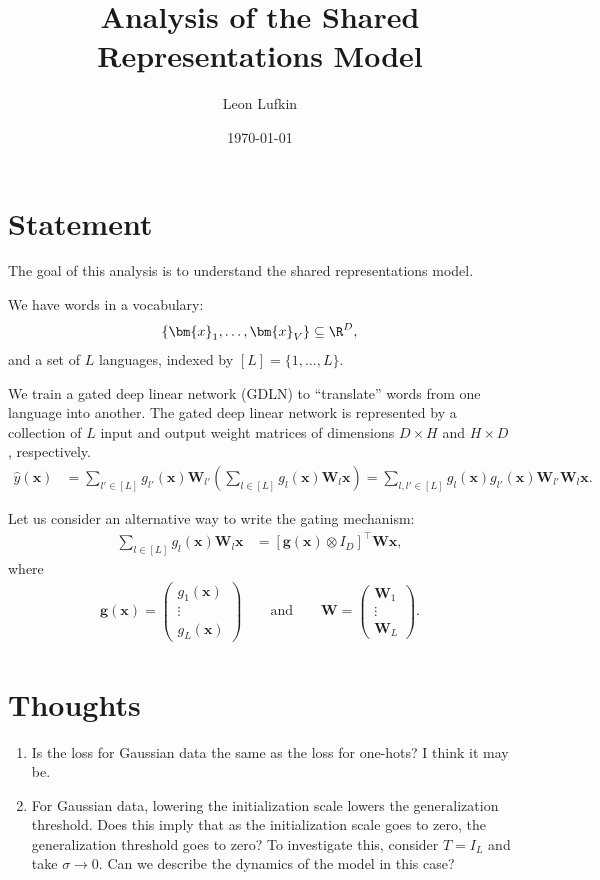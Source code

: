 \documentclass{article}
\title{Analysis of the Shared Representations Model}
\author{Leon Lufkin}
\date{\today}
\begin{document}
\section{Statement}
The goal of this analysis is to understand the shared representations model.

We have words in a vocabulary:
\begin{align*}
    \{ \bm{x}_1, \ldots, \bm{x}_V \} \subseteq \R^D,
\end{align*}
and a set of $L$ languages, indexed by $[L] = \{ 1, \ldots, L \}$.

We train a gated deep linear network (GDLN) to ``translate'' words from one language into another.
The gated deep linear network is represented by a collection of $L$ input and output weight matrices of dimensions $D \times H$ and $H \times D$, respectively.
\begin{align*}
    \hat{y}(\bm{x})
    &= \sum_{l' \in [L]} g_{l'}(\bm{x}) \bm{W}_{l'} \left( \sum_{l \in [L]} g_l(\bm{x}) \bm{W}_l \bm{x} \right) 
    = \sum_{l,l' \in [L]} g_l(\bm{x}) g_{l'}(\bm{x}) \bm{W}_{l'} \bm{W}_l \bm{x}.
\end{align*}

Let us consider an alternative way to write the gating mechanism:
\begin{align*}
    \sum_{l\in[L]} g_l(\bm{x}) \bm{W}_l \bm{x}
    &= [\bm{g}(\bm{x}) \otimes I_D]^\top \bm{W} \bm{x},
\end{align*}
where 
\begin{align*}
    \bm{g}(\bm{x}) = \begin{pmatrix} g_1(\bm{x}) \\ \vdots \\ g_L(\bm{x}) \end{pmatrix}
    \qquad \text{and} \qquad
    \bm{W} = \begin{pmatrix} \bm{W}_1 \\ \vdots \\ \bm{W}_L \end{pmatrix}.
\end{align*}

\section{Thoughts}
\begin{enumerate}
    \item Is the loss for Gaussian data the same as the loss for one-hots? I think it may be.
    \item For Gaussian data, lowering the initialization scale lowers the generalization threshold. Does this imply that as the initialization scale goes to zero, the generalization threshold goes to zero?
    To investigate this, consider $T = I_L$ and take $\sigma \to 0$.
    Can we describe the dynamics of the model in this case?
\end{enumerate}
\end{document}
